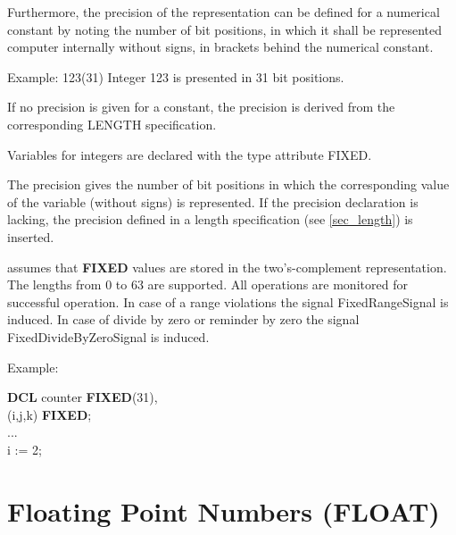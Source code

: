 Furthermore, the precision of the representation can be defined for a
numerical constant by noting the number of bit positions, in which it
shall be represented computer internally without signs, in brackets behind
the numerical constant.

Example: 123(31) \x Integer 123 is presented in 31 bit positions.

If no precision is given for a constant,
the precision is derived from the %
corresponding LENGTH specification.

Variables for integers are declared with the type attribute FIXED.




The precision gives the number of bit positions in which the
corresponding value of the variable (without signs) is represented. If
the precision declaration is lacking, the precision defined in a length
specification (see \ref{sec_length}) is inserted. 

\OpenPEARL{} assumes that {\bf FIXED} values are stored in the two's-complement
representation.  The lengths from 0 to 63 are supported.
All operations are monitored for successful operation.
In case of a range violations the signal FixedRangeSignal is induced.
In case of divide by zero or reminder by zero the signal FixedDivideByZeroSignal
is induced.

Example:

{\bf DCL} counter {\bf FIXED}(31),\\
\x (i,j,k) {\bf FIXED};\\
...\\
i := 2;

\section{Floating Point Numbers (FLOAT)}  %

